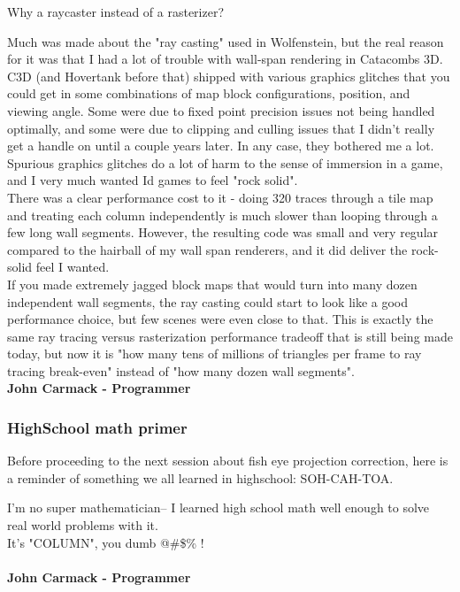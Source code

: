 \begin{fancyquotes}
Why a raycaster instead of a rasterizer?\\
\par
Much was made about the "ray casting" used in Wolfenstein, but the real reason for it was that I had a lot of trouble with wall-span rendering in Catacombs 3D.  C3D (and Hovertank before that) shipped with various graphics glitches that you could get in some combinations of map block configurations, position, and viewing angle.  Some were due to fixed point precision issues not being handled optimally, and some were due to clipping and culling issues that I didn't really get a handle on until a couple years later.  In any case, they bothered me a lot.  Spurious graphics glitches do a lot of harm to the sense of immersion in a game, and I very much wanted Id games to feel "rock solid".
 \bigskip \\
There was a clear performance cost to it - doing 320 traces through a tile map and treating each column independently is much slower than looping through a few long wall segments.  However, the resulting code was small and very regular compared to the hairball of my wall span renderers, and it did deliver the rock-solid feel I wanted.
 \bigskip \\
If you made extremely jagged block maps that would turn into many dozen independent wall segments, the ray casting could start to look like a good performance choice, but few scenes were even close to that.  This is exactly the same ray tracing versus rasterization performance tradeoff that is still being made today, but now it is "how many tens of millions of triangles per frame to ray tracing break-even" instead of "how many dozen wall segments".
 \bigskip \\
\textbf{John Carmack - Programmer}
 \end{fancyquotes}







\subsubsection{HighSchool math primer}
Before proceeding to the next session about fish eye projection correction, here is a reminder of something we all learned in highschool: SOH-CAH-TOA.

 \begin{fancyquotes}
  I'm no super mathematician-- I learned high school math well enough to solve real world problems with it.
 \bigskip \\
It's "COLUMN", you dumb @\#\$\% !\\
 \bigskip \\
\textbf{John Carmack - Programmer}
 \end{fancyquotes}



